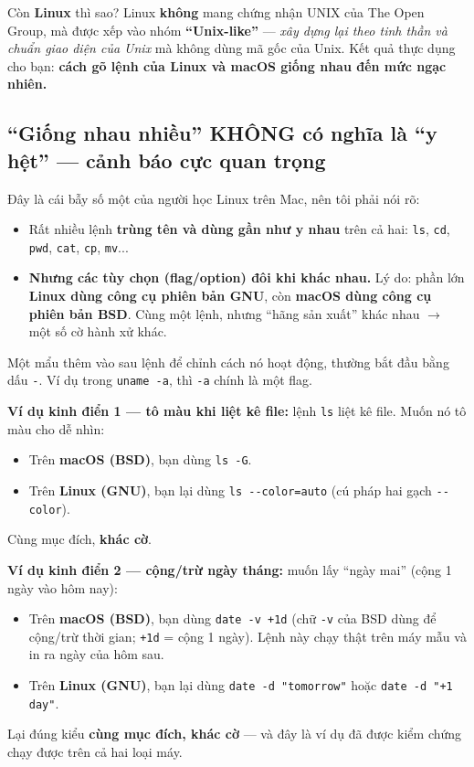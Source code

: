 \documentclass[12pt,a4paper]{article}
\begin{document}
Còn \textbf{Linux} thì sao? Linux \textbf{không} mang chứng nhận UNIX của The Open Group, mà được xếp vào nhóm \textbf{``Unix-like''} — \textit{xây dựng lại theo tinh thần và chuẩn giao diện của Unix} mà không dùng mã gốc của Unix. Kết quả thực dụng cho bạn: \textbf{cách gõ lệnh của Linux và macOS giống nhau đến mức ngạc nhiên.}

\subsection{``Giống nhau nhiều'' KHÔNG có nghĩa là ``y hệt'' — cảnh báo cực quan trọng}

Đây là cái bẫy số một của người học Linux trên Mac, nên tôi phải nói rõ:

\begin{itemize}[leftmargin=*]
  \item Rất nhiều lệnh \textbf{trùng tên và dùng gần như y nhau} trên cả hai: \texttt{ls}, \texttt{cd}, \texttt{pwd}, \texttt{cat}, \texttt{cp}, \texttt{mv}...
  \item \textbf{Nhưng các tùy chọn (flag/option) đôi khi khác nhau.} Lý do: phần lớn \textbf{Linux dùng công cụ phiên bản GNU}, còn \textbf{macOS dùng công cụ phiên bản BSD}. Cùng một lệnh, nhưng ``hãng sản xuất'' khác nhau $\rightarrow$ một số cờ hành xử khác.
\end{itemize}

\begin{defbox}
Một mẩu thêm vào sau lệnh để chỉnh cách nó hoạt động, thường bắt đầu bằng dấu \texttt{-}. Ví dụ trong \texttt{uname -a}, thì \texttt{-a} chính là một flag.
\end{defbox}

\textbf{Ví dụ kinh điển 1 — tô màu khi liệt kê file:} lệnh \texttt{ls} liệt kê file. Muốn nó tô màu cho dễ nhìn:
\begin{itemize}[leftmargin=*]
  \item Trên \textbf{macOS (BSD)}, bạn dùng \texttt{ls -G}.
  \item Trên \textbf{Linux (GNU)}, bạn lại dùng \texttt{ls -{}-color=auto} (cú pháp hai gạch \texttt{-{}-color}).
\end{itemize}
Cùng mục đích, \textbf{khác cờ}.

\textbf{Ví dụ kinh điển 2 — cộng/trừ ngày tháng:} muốn lấy ``ngày mai'' (cộng 1 ngày vào hôm nay):
\begin{itemize}[leftmargin=*]
  \item Trên \textbf{macOS (BSD)}, bạn dùng \texttt{date -v +1d} (chữ \texttt{-v} của BSD dùng để cộng/trừ thời gian; \texttt{+1d} = cộng 1 ngày). Lệnh này chạy thật trên máy mẫu và in ra ngày của hôm sau.
  \item Trên \textbf{Linux (GNU)}, bạn lại dùng \texttt{date -d "tomorrow"} hoặc \texttt{date -d "+1 day"}.
\end{itemize}
Lại đúng kiểu \textbf{cùng mục đích, khác cờ} — và đây là ví dụ đã được kiểm chứng chạy được trên cả hai loại máy.
\end{document}

